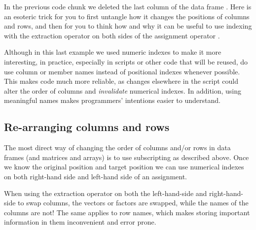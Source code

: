 \documentclass[krantz2]{krantz}\usepackage{knitr}
\begin{document}
\begin{playground}
In the previous code chunk we deleted the last column of the data frame .
Here is an esoteric trick for you to first untangle how it changes the positions of columns and rows, and then for you to think how and why it can be useful to use indexing with the extraction operator \Roperator{[ ]} on both sides of the assignment operator \Roperator{<-}.

\begin{knitrout}\footnotesize
{}\color{fgcolor}\begin{kframe}
\begin{alltt}
\hlstd{a.df[}\hlopt{:}\hlstd{,} \hlstd{(}\hlstd{,}\hlstd{)]} \hlkwb{<-} \hlstd{a.df[}\hlopt{:}\hlstd{,} \hlstd{(}\hlstd{,}\hlstd{)]}
\end{alltt}
\end{kframe}
\end{knitrout}
\end{playground}

\begin{warningbox}
Although in this last example we used numeric indexes to make it more interesting, in practice, especially in scripts or other code that will be reused, do use column or member names instead of positional indexes whenever possible. This makes code much more reliable, as changes elsewhere in the script could alter the order of columns and \emph{invalidate} numerical indexes. In addition, using meaningful names makes programmers' intentions easier to understand.
\end{warningbox}

\subsection{Re-arranging columns and rows}
The most direct way of changing the order of columns and/or rows in data frames (and matrices and arrays) is to use subscripting as described above. Once we know the original position and target position we can use numerical indexes on both right-hand side and left-hand side of an assignment.

\begin{warningbox}
When using the extraction operator \Roperator{[]} on both the left-hand-side and right-hand-side to swap columns, the vectors or factors are swapped, while the names of the columns are not! The same applies to row names, which makes storing important information in them inconvenient and error prone.
\end{warningbox}
\end{document}

